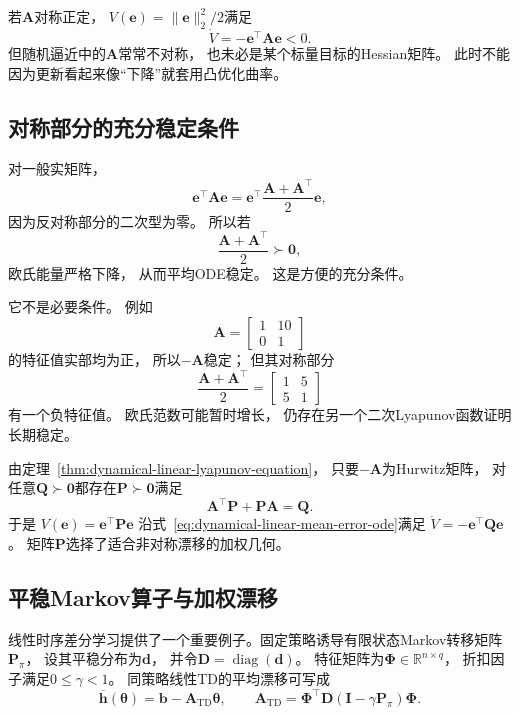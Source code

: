 若$\bm{A}$对称正定， $V(\bm{e})=\lVert\bm{e}\rVert_{2}^{2}/2$满足
\[
	\dot V = -\bm{e}^{\top}\bm{A}\bm{e}<0.
\]
但随机逼近中的$\bm{A}$常常不对称， 也未必是某个标量目标的Hessian矩阵。 此时不能因为更新看起来像“下降”就套用凸优化曲率。

\subsection{对称部分的充分稳定条件}

对一般实矩阵，
\[
	\bm{e}^{\top}\bm{A}\bm{e}= \bm{e}^{\top}\frac{\bm{A}+\bm{A}^{\top}}{2}\bm{e},
\]
因为反对称部分的二次型为零。 所以若
\begin{equation}
	\frac{\bm{A}+\bm{A}^{\top}}{2}\succ\bm{0}, \label{eq:dynamical-positive-symmetric-part}
\end{equation}
欧氏能量严格下降， 从而平均ODE稳定。 这是方便的充分条件。

它不是必要条件。 例如
\[
	\bm{A}=
	\begin{bmatrix}
		1 & 10 \\
		0 & 1
	\end{bmatrix}
\]
的特征值实部均为正， 所以$-\bm{A}$稳定； 但其对称部分
\[
	\frac{\bm{A}+\bm{A}^{\top}}{2}=
	\begin{bmatrix}
		1 & 5 \\
		5 & 1
	\end{bmatrix}
\]
有一个负特征值。 欧氏范数可能暂时增长，
仍存在另一个二次Lyapunov函数证明长期稳定。

由定理~\ref{thm:dynamical-linear-lyapunov-equation}， 只要$-\bm{A}$为Hurwitz矩阵，
对任意$\bm{Q}\succ\bm{0}$都存在$\bm{P}\succ\bm{0}$满足
\begin{equation}
	\bm{A}^{\top}\bm{P}+\bm{P}\bm{A}= \bm{Q}. \label{eq:dynamical-mean-drift-lyapunov}
\end{equation}
于是 $V(\bm{e})=\bm{e}^{\top}\bm{P}\bm{e}$ 沿式~\eqref{eq:dynamical-linear-mean-error-ode}满足
$\dot V=-\bm{e}^{\top}\bm{Q}\bm{e}$。 矩阵$\bm{P}$选择了适合非对称漂移的加权几何。

\subsection{平稳Markov算子与加权漂移}

线性时序差分学习提供了一个重要例子。固定策略诱导有限状态Markov转移矩阵$\bm{P}_{\pi}$，
设其平稳分布为$\bm{d}$， 并令$\bm{D}=\operatorname{diag}(\bm{d})$。 特征矩阵为$\bm
{\Phi}\in\mathbb{R}^{n\times q}$， 折扣因子满足$0\leq\gamma<1$。 同策略线性TD的平均漂移可写成
\begin{equation}
\overline{\bm{h}}(\bm{\theta}) = \bm{b}-\bm{A}_{\mathrm{TD}}\bm{\theta},
\qquad
\bm{A}_{\mathrm{TD}}= \bm{\Phi}^{\top}\bm{D}
(\bm{I}-\gamma\bm{P}_{\pi}) \bm{\Phi}.
\label{eq:dynamical-td-mean-matrix}
\end{equation}

